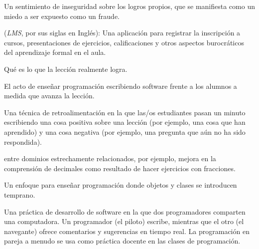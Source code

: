 \begin{description}
 Un sentimiento de inseguridad sobre 
los logros propios, que se manifiesta como un miedo a ser expuesto como un fraude.



















 (\emph{LMS}, por sus siglas en Inglés): Una aplicación para registrar la inscripción a cursos, presentaciones de ejercicios, calificaciones y otros aspectos burocráticos del aprendizaje formal en el aula.



 Qué es lo que la lección realmente logra.



 El acto de enseñar programación 
escribiendo software frente a los alumnos a medida que avanza la lección.














 Una técnica de retroalimentación en la 
que las/os estudiantes pasan un minuto escribiendo una cosa positiva sobre una lección 
(por ejemplo, una cosa que han aprendido) y una cosa negativa (por ejemplo, una pregunta que aún no ha sido respondida).

  entre dominios estrechamente relacionados, por ejemplo, mejora en la comprensión de decimales como resultado de hacer ejercicios con fracciones.





 Un enfoque para enseñar programación donde 
objetos y clases se introducen temprano.

 Una práctica de desarrollo de software en la que dos programadores comparten una computadora. Un programador (el piloto) escribe, mientras que el otro (el navegante) ofrece comentarios y sugerencias en tiempo real. La programación en pareja a menudo se usa como práctica docente en las clases de programación.



\end{description}
